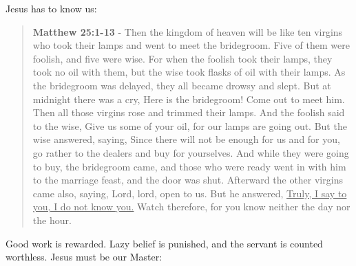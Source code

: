 \documentclass[11pt]{article}
\begin{document}
Jesus has to know us:

\begin{quote}
\textbf{Matthew 25:1-13} - Then the kingdom of heaven will be like ten virgins who took their lamps and went to meet the bridegroom. Five of them were foolish, and five were wise. For when the foolish took their lamps, they took no oil with them, but the wise took flasks of oil with their lamps. As the bridegroom was delayed, they all became drowsy and slept. But at midnight there was a cry, Here is the bridegroom! Come out to meet him. Then all those virgins rose and trimmed their lamps. And the foolish said to the wise, Give us some of your oil, for our lamps are going out. But the wise answered, saying, Since there will not be enough for us and for you, go rather to the dealers and buy for yourselves. And while they were going to buy, the bridegroom came, and those who were ready went in with him to the marriage feast, and the door was shut. Afterward the other virgins came also, saying, Lord, lord, open to us. But he answered, \uline{Truly, I say to you, I do not know you.} Watch therefore, for you know neither the day nor the hour.
\end{quote}

Good work is rewarded. Lazy belief is punished, and the servant is counted worthless. Jesus must be our Master:
\end{document}
